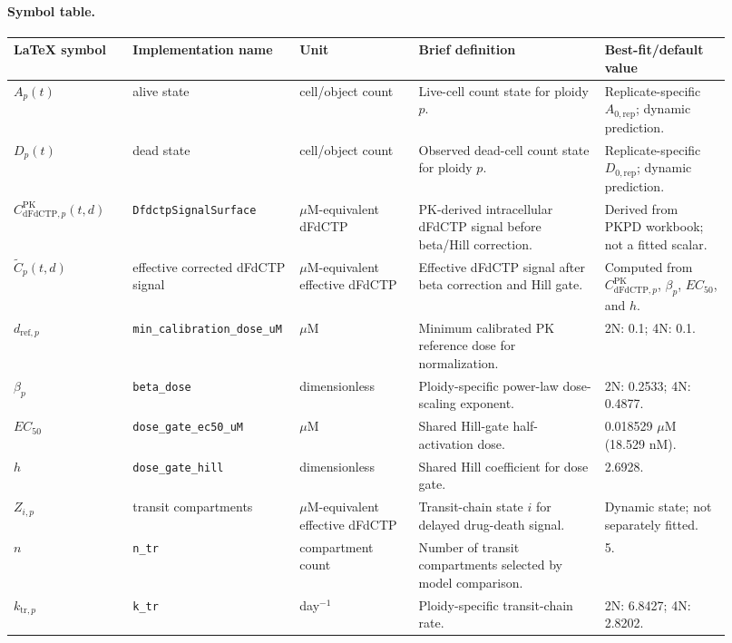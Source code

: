 \documentclass[11pt,notitlepage]{article}
\begin{document}
\paragraph{Symbol table.}
\begin{center}
\footnotesize
\begin{tabular}{p{0.16\linewidth}p{0.18\linewidth}p{0.16\linewidth}p{0.25\linewidth}p{0.17\linewidth}}
\hline
LaTeX symbol & Implementation name & Unit & Brief definition & Best-fit/default value \\
\hline
$A_p(t)$ & alive state & cell/object count & Live-cell count state for ploidy $p$. & Replicate-specific $A_{0,\mathrm{rep}}$; dynamic prediction. \\
$D_p(t)$ & dead state & cell/object count & Observed dead-cell count state for ploidy $p$. & Replicate-specific $D_{0,\mathrm{rep}}$; dynamic prediction. \\
$C_{\mathrm{dFdCTP},p}^{\mathrm{PK}}(t,d)$ & \texttt{DfdctpSignalSurface} & $\mu$M-equivalent dFdCTP & PK-derived intracellular dFdCTP signal before beta/Hill correction. & Derived from PKPD workbook; not a fitted scalar. \\
$\widetilde{C}_{p}(t,d)$ & effective corrected dFdCTP signal & $\mu$M-equivalent effective dFdCTP & Effective dFdCTP signal after beta correction and Hill gate. & Computed from $C_{\mathrm{dFdCTP},p}^{\mathrm{PK}}$, $\beta_p$, $EC_{50}$, and $h$. \\
$d_{\mathrm{ref},p}$ & \texttt{min\_calibration\_dose\_uM} & $\mu$M & Minimum calibrated PK reference dose for normalization. & 2N: 0.1; 4N: 0.1. \\
$\beta_p$ & \texttt{beta\_dose} & dimensionless & Ploidy-specific power-law dose-scaling exponent. & 2N: 0.2533; 4N: 0.4877. \\
$EC_{50}$ & \texttt{dose\_gate\_ec50\_uM} & $\mu$M & Shared Hill-gate half-activation dose. & 0.018529 $\mu$M (18.529 nM). \\
$h$ & \texttt{dose\_gate\_hill} & dimensionless & Shared Hill coefficient for dose gate. & 2.6928. \\
$Z_{i,p}$ & transit compartments & $\mu$M-equivalent effective dFdCTP & Transit-chain state $i$ for delayed drug-death signal. & Dynamic state; not separately fitted. \\
$n$ & \texttt{n\_tr} & compartment count & Number of transit compartments selected by model comparison. & 5. \\
$k_{\mathrm{tr},p}$ & \texttt{k\_tr} & day$^{-1}$ & Ploidy-specific transit-chain rate. & 2N: 6.8427; 4N: 2.8202. \\

\end{tabular}
\end{center}
\end{document}
